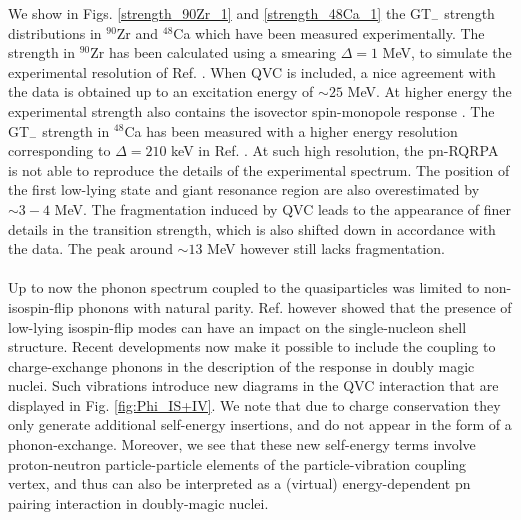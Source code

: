 \documentclass{PoS}
\begin{document}
%
$\;$\\
\noindent We show in Figs. \ref{strength_90Zr_1} and \ref{strength_48Ca_1} the GT$_-$ strength distributions in $^{90}$Zr and $^{48}$Ca which have been measured experimentally.
The strength in $^{90}$Zr has been calculated using a smearing $\Delta = 1$ MeV, to simulate the experimental resolution of Ref. \cite{Wakasa}.
When QVC is included, a nice agreement with the data is obtained up to an excitation energy of $\sim25$ MeV. At higher energy the experimental strength also contains the isovector spin-monopole response \cite{Wakasa}.
%
The GT$_-$ strength in $^{48}$Ca has been measured with a higher energy resolution corresponding to $\Delta = 210$ keV in Ref. \cite{Yako}. At such high resolution, the pn-RQRPA is not able to reproduce the details of the experimental spectrum. The position of the first low-lying state and giant resonance region are also overestimated by $\sim 3-4$ MeV. 
The fragmentation induced by QVC leads to the appearance of finer details in the transition strength, which is also shifted down in accordance with the data. The peak around $\sim 13$ MeV however still lacks fragmentation.
\\ \\
\indent Up to now the phonon spectrum coupled to the quasiparticles was limited to non-isospin-flip phonons with natural parity. 
Ref. \cite{Litvinova2016} however showed that the presence of low-lying isospin-flip modes can have an impact on the single-nucleon shell structure. Recent developments now make it possible to include the coupling to charge-exchange phonons in the description of the response in doubly magic nuclei. Such vibrations introduce new diagrams in the QVC interaction that are displayed in Fig. \ref{fig:Phi_IS+IV}. We note that due to charge conservation they only generate additional self-energy insertions, and do not appear in the form of a phonon-exchange. Moreover, we see that these new self-energy terms involve proton-neutron particle-particle elements of the particle-vibration coupling vertex, and thus can also be interpreted as a (virtual) energy-dependent pn pairing interaction in doubly-magic nuclei.
\begin{figure*}
\centering
{}
\caption{QVC interaction in the proton-neutron channel. The wavy lines represent isoscalar (non-isospin-flip) phonons while the springs represent isovector (isospin-flip) phonons.}
\label{fig:Phi_IS+IV}
\end{figure*}
%
$\;$ \\
\end{document}

